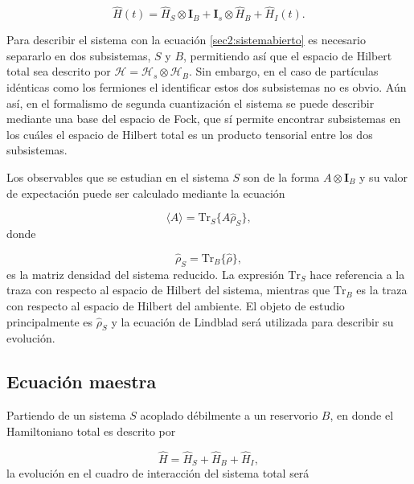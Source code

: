 \begin{equation}
    \hat{H}(t) = \hat{H}_{S} \otimes \mathbf{I}_{B} + \mathbf{I}_{s} \otimes \hat{H}_{B} + \hat{H}_{I}(t).
    \label{sec2:sistemabierto}
\end{equation}

Para describir el sistema con la ecuación \ref{sec2:sistemabierto} es necesario separarlo en dos subsistemas, $S$ y $B$, permitiendo así que el espacio de Hilbert total sea descrito por $\mathcal{H} = \mathcal{H}_{s}\otimes \mathcal{H}_{B}$. Sin embargo, en el caso de partículas idénticas como los fermiones el identificar estos dos subsistemas no es obvio. Aún así, en el formalismo de segunda cuantización el sistema se puede describir mediante una base del espacio de Fock, que sí permite encontrar subsistemas en los cuáles el espacio de Hilbert total es un producto tensorial entre los dos subsistemas\cite{friis2013fermionic,vidal2021quantum}.

Los observables que se estudian en el sistema $S$ son de la forma $A\otimes \mathbf{I}_{B}$ y su valor de expectación puede ser calculado mediante la ecuación

\begin{equation*}
    \langle A \rangle = \text{Tr}_{S}\{A \hat{\rho}_{S} \},
\end{equation*}
donde 

\begin{equation*}
    \hat{\rho}_{S} = \text{Tr}_{B}\{ \hat{\rho} \},
\end{equation*}
es la matriz densidad del sistema reducido. La expresión $\text{Tr}_{S}$ hace referencia a la traza con respecto al espacio de Hilbert del sistema, mientras que $\text{Tr}_{B}$  
es la traza con respecto al espacio de Hilbert del ambiente. El objeto de estudio principalmente es $\hat{\rho}_{S}$ y la ecuación de Lindblad será utilizada para describir su evolución.

\subsection{Ecuación maestra}
Partiendo de un sistema $S$ acoplado débilmente a un reservorio $B$, en donde el Hamiltoniano total es descrito por 

\begin{equation*}
    \hat{H} = \hat{H}_{S} + \hat{H}_{B} + \hat{H}_{I},
\end{equation*}
la evolución en el cuadro de interacción del sistema total será

